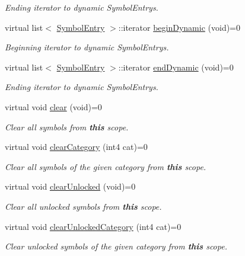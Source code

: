 \begin{DoxyCompactItemize}
\begin{DoxyCompactList}\small\item\em Ending iterator to dynamic Symbol\+Entrys. \end{DoxyCompactList}\item 
virtual list$<$ \mbox{\hyperlink{class_symbol_entry}{Symbol\+Entry}} $>$\+::iterator \mbox{\hyperlink{class_scope_a883ad2607f2c7859b49b45100c2c0011}{begin\+Dynamic}} (void)=0
\begin{DoxyCompactList}\small\item\em Beginning iterator to dynamic Symbol\+Entrys. \end{DoxyCompactList}\item 
virtual list$<$ \mbox{\hyperlink{class_symbol_entry}{Symbol\+Entry}} $>$\+::iterator \mbox{\hyperlink{class_scope_a37c892157b9de825a3b475581fbf4019}{end\+Dynamic}} (void)=0
\begin{DoxyCompactList}\small\item\em Ending iterator to dynamic Symbol\+Entrys. \end{DoxyCompactList}\item 
virtual void \mbox{\hyperlink{class_scope_a9bfa2b0a98ba3ceeafd5a1e7ad2e2c21}{clear}} (void)=0
\begin{DoxyCompactList}\small\item\em Clear all symbols from {\bfseries{this}} scope. \end{DoxyCompactList}\item 
virtual void \mbox{\hyperlink{class_scope_ab3c8275b6500a9cc620cc31f32ed267e}{clear\+Category}} (int4 cat)=0
\begin{DoxyCompactList}\small\item\em Clear all symbols of the given category from {\bfseries{this}} scope. \end{DoxyCompactList}\item 
virtual void \mbox{\hyperlink{class_scope_ac7d58385a87dca33d128300c666e5064}{clear\+Unlocked}} (void)=0
\begin{DoxyCompactList}\small\item\em Clear all unlocked symbols from {\bfseries{this}} scope. \end{DoxyCompactList}\item 
virtual void \mbox{\hyperlink{class_scope_a15fc66a463ca11a4c533991cea0639c8}{clear\+Unlocked\+Category}} (int4 cat)=0
\begin{DoxyCompactList}\small\item\em Clear unlocked symbols of the given category from {\bfseries{this}} scope. \end{DoxyCompactList}\item 

\end{DoxyCompactItemize}

